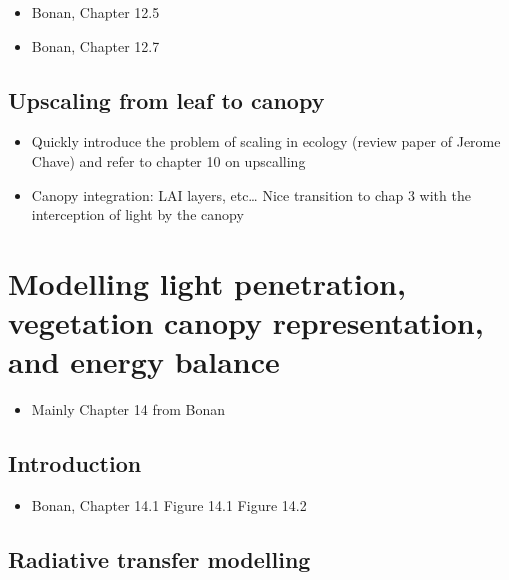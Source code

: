 \documentclass[
  oneside]{book}
\providecommand{\tightlist}{%
  \setlength{\itemsep}{0pt}\setlength{\parskip}{0pt}}
\begin{document}
\begin{itemize}
\tightlist
\item
  Bonan, Chapter 12.5
\item
  Bonan, Chapter 12.7
\end{itemize}

\hypertarget{upscaling-from-leaf-to-canopy}{%
\section{Upscaling from leaf to canopy}\label{upscaling-from-leaf-to-canopy}}

\begin{itemize}
\tightlist
\item
  Quickly introduce the problem of scaling in ecology (review paper of Jerome Chave) and refer to chapter 10 on upscalling
\item
  Canopy integration: LAI layers, etc\ldots{} Nice transition to chap 3 with the interception of light by the canopy
\end{itemize}

\hypertarget{modelling-light-penetration-vegetation-canopy-representation-and-energy-balance}{%
\chapter{Modelling light penetration, vegetation canopy representation, and energy balance}\label{modelling-light-penetration-vegetation-canopy-representation-and-energy-balance}}


\begin{itemize}
\tightlist
\item
  Mainly Chapter 14 from Bonan
\end{itemize}

\hypertarget{introduction}{%
\section{Introduction}\label{introduction}}

\begin{itemize}
\tightlist
\item
  Bonan, Chapter 14.1
  Figure 14.1
  Figure 14.2
\end{itemize}

\hypertarget{radiative-transfer-modelling}{%
\section{Radiative transfer modelling}\label{radiative-transfer-modelling}}
\end{document}
